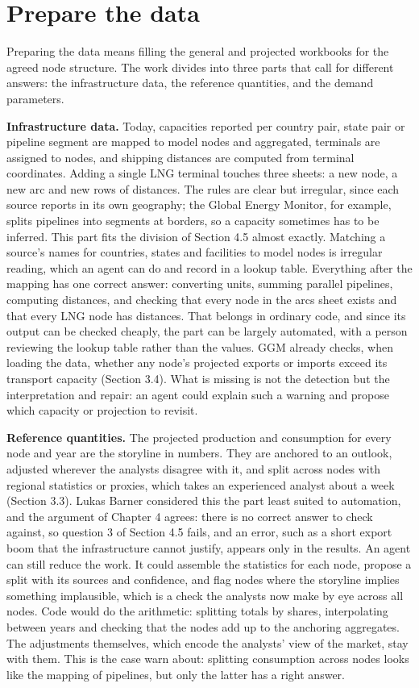 \section{Prepare the data}

Preparing the data means filling the general and projected workbooks for the agreed node structure.
The work divides into three parts that call for different answers: the infrastructure data, the reference quantities, and the demand parameters.

\textbf{Infrastructure data.} Today, capacities reported per country pair, state pair or pipeline segment are mapped to model nodes and aggregated, terminals are assigned to nodes, and shipping distances are computed from terminal coordinates.
Adding a single LNG terminal touches three sheets: a new node, a new arc and new rows of distances.
The rules are clear but irregular, since each source reports in its own geography; the Global Energy Monitor, for example, splits pipelines into segments at borders, so a capacity sometimes has to be inferred.
This part fits the division of Section 4.5 almost exactly.
Matching a source's names for countries, states and facilities to model nodes is irregular reading, which an agent can do and record in a lookup table.
Everything after the mapping has one correct answer: converting units, summing parallel pipelines, computing distances, and checking that every node in the arcs sheet exists and that every LNG node has distances.
That belongs in ordinary code, and since its output can be checked cheaply, the part can be largely automated, with a person reviewing the lookup table rather than the values.
GGM already checks, when loading the data, whether any node's projected exports or imports exceed its transport capacity (Section 3.4).
What is missing is not the detection but the interpretation and repair: an agent could explain such a warning and propose which capacity or projection to revisit.

\textbf{Reference quantities.} The projected production and consumption for every node and year are the storyline in numbers.
They are anchored to an outlook, adjusted wherever the analysts disagree with it, and split across nodes with regional statistics or proxies, which takes an experienced analyst about a week (Section 3.3).
Lukas Barner considered this the part least suited to automation, and the argument of Chapter 4 agrees: there is no correct answer to check against, so question 3 of Section 4.5 fails, and an error, such as a short export boom that the infrastructure cannot justify, appears only in the results.
An agent can still reduce the work.
It could assemble the statistics for each node, propose a split with its sources and confidence, and flag nodes where the storyline implies something implausible, which is a check the analysts now make by eye across all nodes.
Code would do the arithmetic: splitting totals by shares, interpolating between years and checking that the nodes add up to the anchoring aggregates.
The adjustments themselves, which encode the analysts' view of the market, stay with them.
This is the case \citet{dellacqua2026navigating} warn about: splitting consumption across nodes looks like the mapping of pipelines, but only the latter has a right answer.

